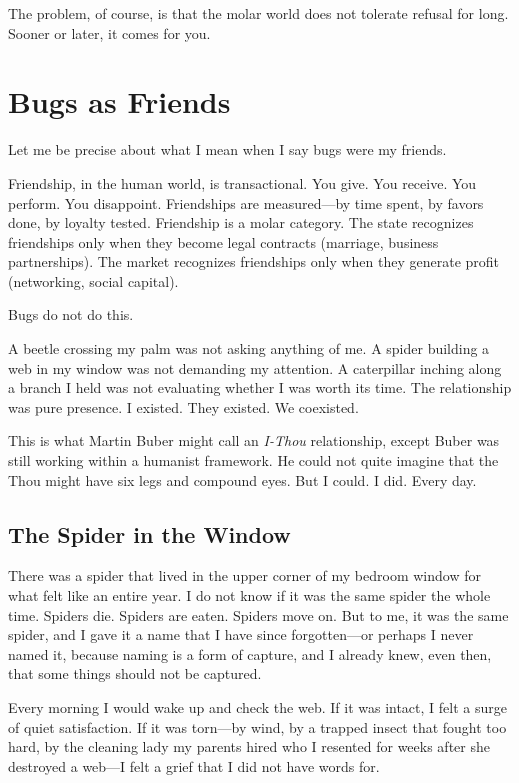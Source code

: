 \documentclass[11pt,openany]{book}
\begin{document}
The problem, of course, is that the molar world does not tolerate refusal for long. Sooner or later, it comes for you.

\chapter{Bugs as Friends}

Let me be precise about what I mean when I say bugs were my friends.

Friendship, in the human world, is transactional. You give. You receive. You perform. You disappoint. Friendships are measured---by time spent, by favors done, by loyalty tested. Friendship is a molar category. The state recognizes friendships only when they become legal contracts (marriage, business partnerships). The market recognizes friendships only when they generate profit (networking, social capital).

Bugs do not do this.

A beetle crossing my palm was not asking anything of me. A spider building a web in my window was not demanding my attention. A caterpillar inching along a branch I held was not evaluating whether I was worth its time. The relationship was pure presence. I existed. They existed. We coexisted.

This is what Martin Buber might call an \textit{I-Thou} relationship, except Buber was still working within a humanist framework. He could not quite imagine that the Thou might have six legs and compound eyes. But I could. I did. Every day.

\section*{The Spider in the Window}

There was a spider that lived in the upper corner of my bedroom window for what felt like an entire year. I do not know if it was the same spider the whole time. Spiders die. Spiders are eaten. Spiders move on. But to me, it was the same spider, and I gave it a name that I have since forgotten---or perhaps I never named it, because naming is a form of capture, and I already knew, even then, that some things should not be captured.

Every morning I would wake up and check the web. If it was intact, I felt a surge of quiet satisfaction. If it was torn---by wind, by a trapped insect that fought too hard, by the cleaning lady my parents hired who I resented for weeks after she destroyed a web---I felt a grief that I did not have words for.
\end{document}
